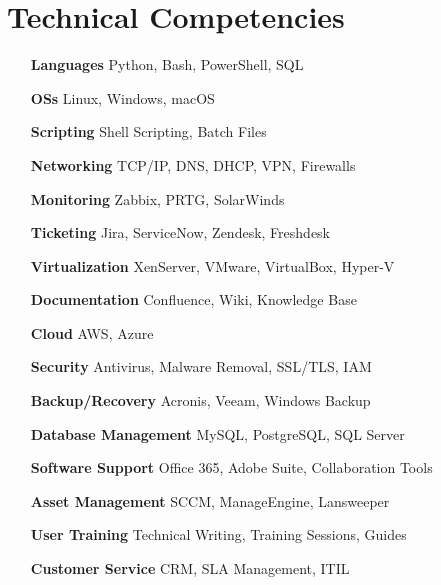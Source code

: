 \section{Technical Competencies}

\begin{multicols}{2}
    \begin{itemize}[itemsep=-2px, parsep=1pt, leftmargin=75pt]
        \item[\textbf{Languages}] Python, Bash, PowerShell, SQL
        \item[\textbf{OSs}] Linux, Windows, macOS
        \item[\textbf{Scripting}] Shell Scripting, Batch Files
        \item[\textbf{Networking}] TCP/IP, DNS, DHCP, VPN, Firewalls
        \item[\textbf{Monitoring}] Zabbix, PRTG, SolarWinds
        \item[\textbf{Ticketing}] Jira, ServiceNow, Zendesk, Freshdesk
        \item[\textbf{Virtualization}] XenServer, VMware, VirtualBox, Hyper-V
        \item[\textbf{Documentation}] Confluence, Wiki, Knowledge Base
        \item[\textbf{Cloud}] AWS, Azure
        \item[\textbf{Security}] Antivirus, Malware Removal, SSL/TLS, IAM
        \item[\textbf{Backup/Recovery}] Acronis, Veeam, Windows Backup
        \item[\textbf{Database Management}] MySQL, PostgreSQL, SQL Server
        \item[\textbf{Software Support}] Office 365, Adobe Suite, Collaboration Tools
        \item[\textbf{Asset Management}] SCCM, ManageEngine, Lansweeper
        \item[\textbf{User Training}] Technical Writing, Training Sessions, Guides
        \item[\textbf{Customer Service}] CRM, SLA Management, ITIL
    \end{itemize}
\end{multicols}
